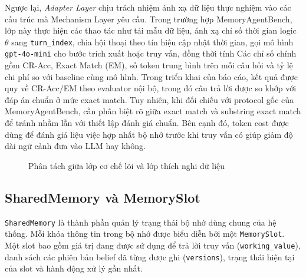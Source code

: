\documentclass[12pt,a4paper]{article}
\newcommand{\code}[1]{\texttt{#1}}
\begin{document}
Ngược lại, \textit{Adapter Layer} chịu trách nhiệm ánh xạ dữ liệu thực nghiệm vào các cấu trúc mà Mechanism Layer yêu cầu. Trong trường hợp MemoryAgentBench, lớp này thực hiện các thao tác như tải mẫu dữ liệu, ánh xạ chỉ số thời gian logic \(\theta\) sang \code{turn\_index}, chia hội thoại theo tín hiệu cập nhật thời gian, gọi mô hình \code{gpt-4o-mini} cho bước trích xuất hoặc truy vấn, đồng thời tính Các chỉ số chính gồm CR-Acc, Exact Match (EM), số token trung bình trên mỗi câu hỏi và tỷ lệ chi phí so với baseline cùng mô hình. Trong triển khai của báo cáo, kết quả được quy về CR-Acc/EM theo evaluator nội bộ, trong đó câu trả lời được so khớp với đáp án chuẩn ở mức exact match. Tuy nhiên, khi đối chiếu với protocol gốc của MemoryAgentBench, cần phân biệt rõ giữa exact match và substring exact match để tránh nhầm lẫn với thiết lập đánh giá chuẩn. Bên cạnh đó, token cost được dùng để đánh giá liệu việc hợp nhất bộ nhớ trước khi truy vấn có giúp giảm độ dài ngữ cảnh đưa vào LLM hay không.

\begin{figure}[H]
    \centering
    \caption{Phân tách giữa lớp cơ chế lõi và lớp thích nghi dữ liệu}
    \label{fig:layers}
\end{figure}

\subsection{SharedMemory và MemorySlot}

\code{SharedMemory} là thành phần quản lý trạng thái bộ nhớ dùng chung của hệ thống. Mỗi khóa thông tin trong bộ nhớ được biểu diễn bởi một \code{MemorySlot}. Một slot bao gồm giá trị đang được sử dụng để trả lời truy vấn (\code{working\_value}), danh sách các phiên bản belief đã từng được ghi (\code{versions}), trạng thái hiện tại của slot và hành động xử lý gần nhất.
\end{document}
